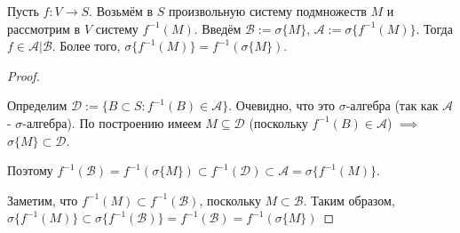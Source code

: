 \begin{lemma}\label{lect05:lemma1}
	Пусть $f: V \to S$. Возьмём в $S$ произвольную систему подмножеств $M$ и рассмотрим в $V$ систему $ f^{-1}(M)$. Введём $\mathcal{B} := \sigma \{M\}$, $\mathcal{A} := \sigma\{f^{-1}(M)\}$. Тогда $f \in \mathcal{A}|\mathcal{B}$. Более того, $\sigma \{ f^{-1}(M)\} = f^{-1}(\sigma\{M\})$.
\end{lemma}
\begin{proof}\,
	
	\fbox{$\supset$}
	Определим $\mathcal{D}:= \{B \subset S : f^{-1}(B) \in \mathcal{A}\}$. Очевидно, что это $\sigma$-алгебра (так как $\mathcal{A} $ - $\sigma$-алгебра). По построению имеем $M \subseteq \mathcal{D}$ (поскольку $f^{-1}(B) \in \mathcal{A}$) $\implies$ $\sigma\{M\} \subset \mathcal{D}$.
	
	Поэтому $f^{-1}(\mathcal{B}) = f^{-1}(\sigma\{M\}) \subset f^{-1}(\mathcal{D}) \subset \mathcal{A} = \sigma \{ f^{-1}(M)\}$.
	
	\fbox{$\subset$} Заметим, что $f^{-1}(M) \subset f^{-1}(\mathcal{B})$, поскольку $M \subset \mathcal{B}$. Таким образом, $\sigma\{f^{-1}(M)\}\subset \sigma\{f^{-1}(\mathcal{B})\} = f^{-1}(\mathcal{B}) = f^{-1}(\sigma\{M\})$
\end{proof}

